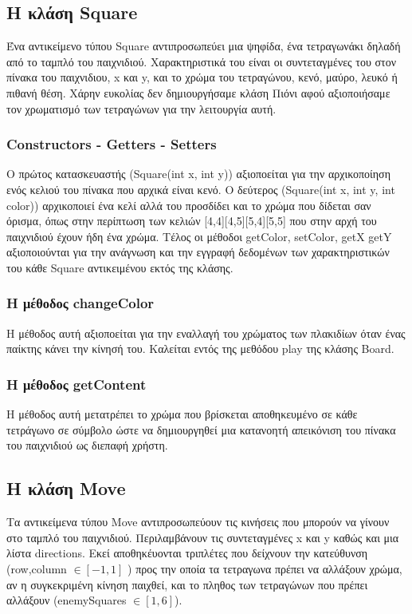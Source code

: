 \documentclass[12pt]{article}
\begin{document}
    \subsection{Η κλάση Square}
    Ένα αντικείμενο τύπου Square αντιπροσωπεύει μια ψηφίδα, ένα τετραγωνάκι δηλαδή από το ταμπλό του παιχνιδιού. Χαρακτηριστικά του είναι οι συντεταγμένες του στον πίνακα του παιχνιδιου, x και y, και το χρώμα του τετραγώνου, κενό, μαύρο, λευκό ή πιθανή θέση. Χάρην ευκολίας δεν δημιουργήσαμε κλάση Πιόνι αφού αξιοποιήσαμε τον χρωματισμό των τετραγώνων για την λειτουργία αυτή. 
        \subsubsection{Constructors - Getters - Setters}
        Ο πρώτος κατασκευαστής (Square(int x, int y)) αξιοποείται για την αρχικοποίηση ενός κελιού του πίνακα που αρχικά είναι κενό. Ο δεύτερος (Square(int x, int y, int color)) αρχικοποιεί ένα κελί αλλά του προσδίδει και το χρώμα που δίδεται σαν όρισμα, όπως στην περίπτωση των κελιών [4,4][4,5][5,4][5,5] που στην αρχή του παιχνιδιού έχουν ήδη ένα χρώμα. Τέλος οι μέθοδοι getColor, setColor, getX getY αξιοποιούνται για την ανάγνωση και την εγγραφή δεδομένων των χαρακτηριστικών του κάθε Square αντικειμένου εκτός της κλάσης.
        \subsubsection{Η μέθοδος changeColor}
        Η μέθοδος αυτή αξιοποείται για την εναλλαγή του χρώματος των πλακιδίων όταν ένας παίκτης κάνει την κίνησή του. Καλείται εντός της μεθόδου play της κλάσης Board.
        \subsubsection{Η μέθοδος getContent}
        Η μέθοδος αυτή μετατρέπει το χρώμα που βρίσκεται αποθηκευμένο σε κάθε τετράγωνο σε σύμβολο ώστε να δημιουργηθεί μια κατανοητή απεικόνιση του πίνακα του παιχνιδιού ως διεπαφή χρήστη. 
    \subsection{Η κλάση Move}
    Τα αντικείμενα τύπου Move αντιπροσωπεύουν τις κινήσεις που μπορούν να γίνουν στο ταμπλό του παιχνιδιού. Περιλαμβάνουν τις συντεταγμένες x και y καθώς και μια λίστα directions. Εκεί αποθηκέυονται τριπλέτες που δείχνουν την κατεύθυνση (row,column $\in [-1,1]$ ) προς την οποία τα τετραγωνα πρέπει να αλλάξουν χρώμα, αν η συγκεκριμένη κίνηση παιχθεί, και το πληθος των τετραγώνων που πρέπει αλλάξουν (enemySquares $\in [1,6]$). 
\end{document}
